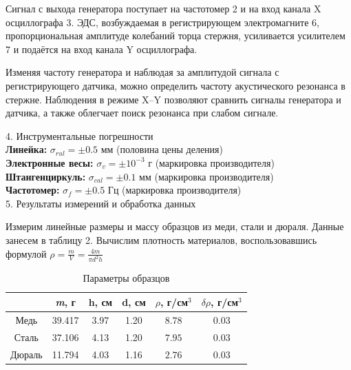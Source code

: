 \documentclass[12pt, a4paper]{article}
\begin{document}
Сигнал с выхода генератора поступает на частотомер 2 и на вход
канала X осциллографа 3. ЭДС, возбуждаемая в регистрирующем электромагните 6, пропорциональная амплитуде колебаний торца стержня, усиливается усилителем 7 и подаётся на вход канала Y осциллографа.

Изменяя частоту генератора и наблюдая за амплитудой сигнала с регистрирующего датчика, можно определить частоту акустического резонанса
в стержне. Наблюдения в режиме X–Y позволяют сравнить сигналы генератора и датчика, а также облегчает поиск резонанса при слабом сигнале.

{\Large 4. Инструментальные погрешности \\}
\textbf{Линейка: } $\sigma_{rul} = \pm 0.5$ мм (половина цены деления)\\
\textbf{Электронные весы: } $\sigma_{v} = \pm 10^{-3}$ г (маркировка производителя) \\
\textbf{Штангенциркуль: } $\sigma_{cal} = \pm 0.1$ мм (маркировка производителя) \\
\textbf{Частотомер: } $\sigma_{f} = \pm 0.5$ Гц (маркировка производителя) \\


\vspace*{0.3cm}
{\Large 5. Результаты измерений и обработка данных \\} 

Измерим линейные размеры и массу образцов из меди, стали и дюраля. Данные занесем в таблицу 2. 
Вычислим плотность материалов, воспользовавшись формулой $\rho = \frac{m}{V} = \frac{4m}{\pi d^2h}$

\begin{table}[h!]
\centering

\begin{tabular}{|c|c|c|c|c|c|}
\hline
 & \textit{m}, г& h, см& d, см& $\rho$, г/см$^3$& $\delta\rho$, г/см$^3$\\
\hline
Медь & 39.417& 3.97& 1.20& $8.78$& $ 0.03$\\
\hline
Сталь & 37.106& 4.13& 1.20& $7.95$& $ 0.03$\\
\hline
Дюраль & 11.794& 4.03& 1.16& $2.76$& $ 0.03$\\
\hline
\end{tabular}
\label{table2}
\caption{Параметры образцов}
\end{table}
\end{document}
